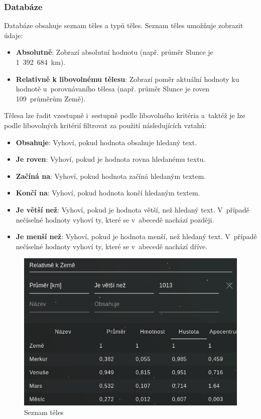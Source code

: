 \documentclass[a4paper,12pt]{article}
\begin{document}
\vspace*{-1cm}
\subsubsection{Databáze}

Databáze obsahuje seznam těles a typů těles. Seznam těles umožňuje zobrazit údaje:

\begin{itemize}
\item \textbf{Absolutně}: Zobrazí absolutní hodnotu (např. průměr Slunce je 1~392~684~km).
\item \textbf{Relativně k libovolnému tělesu}: Zobrazí poměr aktuální hodnoty ku hodnotě u~porovnávaního tělesa (např. průměr Slunce je roven 109~průměrům Země).
\end{itemize}

Tělesa lze řadit vzestupně i~sestupně podle libovolného kritéria a~taktéž je lze podle libovolných kritérií filtrovat za použití následujících vztahů:

\begin{itemize}
\item \textbf{Obsahuje}: Vyhoví, pokud hodnota obsahuje hledaný text.
\item \textbf{Je roven}: Vyhoví, pokud je hodnota rovna hledanému textu.
\item \textbf{Začíná na}: Vyhoví, pokud hodnota začíná hledaným textem.
\item \textbf{Končí na}: Vyhoví, pokud hodnota končí hledaným textem.
\item \textbf{Je větší než}: Vyhoví, pokud je hodnota větší, než hledaný text. V~případě nečíselné hodnoty vyhoví ty, které se v~abecedě nachází později.
\item \textbf{Je menší než}: Vyhoví, pokud je hodnota menší, než hledaný text. V~případě nečíselné hodnoty vyhoví ty, které se v~abecedě nachází dříve.
\end{itemize} 

\begin{figure}[H]
\begin{center}
\includegraphics[width=350pt]{Images/Bodies.png}
\caption{Seznam těles}
\end{center}
\end{figure}
\end{document}
